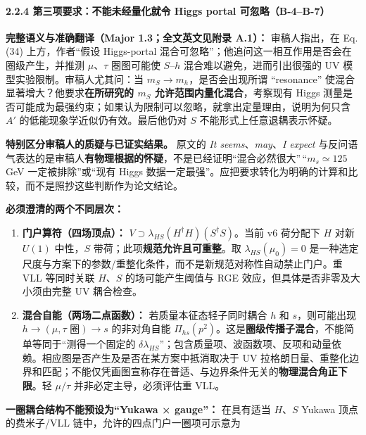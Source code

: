 \documentclass[
  chinese,
  UTF8]{ctexart}
\providecommand{\tightlist}{%
  \setlength{\itemsep}{0pt}\setlength{\parskip}{0pt}}
\begin{document}
\paragraph{2.2.4 第三项要求：不能未经量化就令 Higgs portal
可忽略（B-4--B-7）}\label{ux7b2cux4e09ux9879ux8981ux6c42ux4e0dux80fdux672aux7ecfux91cfux5316ux5c31ux4ee4-higgs-portal-ux53efux5ffdux7565b-4b-7}

\textbf{完整语义与准确翻译（Major 1.3；全文英文见附录 A.1）：}
审稿人指出，在 Eq. (34) 上方，作者``假设 Higgs-portal
混合可忽略''；他追问这一相互作用是否会在圈级产生，并推测
\(\mu\)、\(\tau\) 圈图可能使 \(S\)--\(h\) 混合难以避免，进而引出很强的
UV 模型实验限制。审稿人尤其问：当 \(m_S\to m_h\)，是否会出现所谓
``resonance'' 使混合显著增大？他要求\textbf{在所研究的 \(m_S\)
允许范围内量化混合}，考察现有 Higgs
测量是否可能成为最强约束；如果认为限制可以忽略，就拿出定量理由，说明为何只含
\(A'\) 的低能现象学近似仍有效。最后他仍对 \(S\)
不能形式上任意退耦表示怀疑。

\textbf{特别区分审稿人的质疑与已证实结果。} 原文的 \emph{It
seems}、\emph{may}、\emph{I expect}
与反问语气表达的是审稿人\textbf{有物理根据的怀疑}，不是已经证明``混合必然很大''\,``\(m_s\simeq125\)
GeV 一定被排除''或``现有 Higgs
数据一定最强''。应把要求转化为明确的计算和比较，而不是照抄这些判断作为论文结论。

\textbf{必须澄清的两个不同层次：}

\begin{enumerate}
\def\labelenumi{\arabic{enumi}.}
\tightlist
\item
  \textbf{门户算符（四场顶点）：}
  \(V\supset\lambda_{HS}(H^\dagger H)(S^\dagger S)\)。当前 v6 荷分配下
  \(H\) 对新 \(U(1)\) 中性，\(S\)
  带荷；此项\textbf{规范允许且可重整}。取 \(\lambda_{HS}(\mu_0)=0\)
  是一种选定尺度与方案下的参数/重整化条件，而不是新规范对称性自动禁止门户。重
  VLL 等同时关联 \(H\)、\(S\) 的场可能产生阈值与 RGE
  效应，但具体是否非零及大小须由完整 UV 耦合检查。
\item
  \textbf{混合自能（两场二点函数）：} 若质量本征态轻子同时耦合 \(h\) 和
  \(s\)，则可能出现 \(h\to(\mu,\tau\text{ 圈})\to s\) 的非对角自能
  \(\Pi_{hs}(p^2)\)。这是\textbf{圈级传播子混合}，不能简单等同于``测得一个固定的
  \(\delta\lambda_{HS}\)''；包含质量项、波函数项、反项和动量依赖。相应图是否产生及是否在某方案中抵消取决于
  UV
  拉格朗日量、重整化边界和匹配；不能仅凭画图宣称存在普适、与边界条件无关的\textbf{物理混合角正下限}。轻
  \(\mu/\tau\) 并非必定主导，必须评估重 VLL。
\end{enumerate}

\textbf{一圈耦合结构不能预设为``Yukawa × gauge''：} 在具有适当
\(H\)、\(S\) Yukawa 顶点的费米子/VLL 链中，允许的四点门户一圈项可示意为
\end{document}

